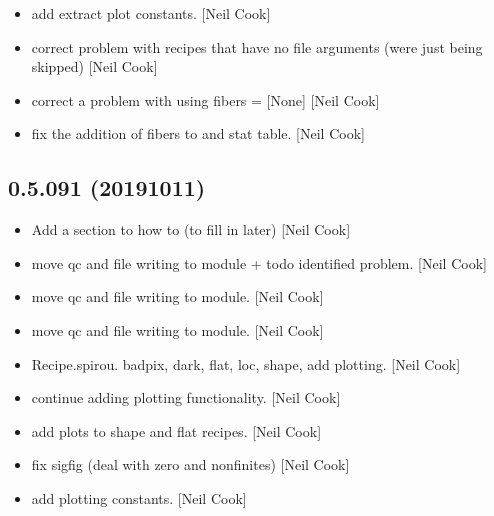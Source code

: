 \documentclass[a4paper,10pt,english]{report}
\begin{document}
\begin{itemize}
\item {} 
 \sphinxhyphen{} add extract plot constants.
{[}Neil Cook{]}

\item {} 
 \sphinxhyphen{} correct problem with recipes that have no
file arguments (were just being skipped) {[}Neil Cook{]}

\item {} 
 \sphinxhyphen{} correct a problem with using fibers = {[}None{]}
{[}Neil Cook{]}

\item {} 
 \sphinxhyphen{} fix the addition of fibers to  and stat
table. {[}Neil Cook{]}

\end{itemize}


\subsection{0.5.091 (2019\sphinxhyphen{}10\sphinxhyphen{}11)}
\label{\detokenize{misc/changelog:id70}}\begin{itemize}
\item {} 
Add a section to how to (to fill in later) {[}Neil Cook{]}

\item {} 
 \sphinxhyphen{} move qc and file writing to module + todo
identified problem. {[}Neil Cook{]}

\item {} 
 \sphinxhyphen{} move qc and file writing to module.
{[}Neil Cook{]}

\item {} 
 \sphinxhyphen{} move qc and file writing to module.
{[}Neil Cook{]}

\item {} 
Recipe.spirou. badpix, dark, flat, loc, shape,  \sphinxhyphen{} add
plotting. {[}Neil Cook{]}

\item {} 
 \sphinxhyphen{} continue adding plotting functionality. {[}Neil Cook{]}

\item {} 
 \sphinxhyphen{} add plots to shape and
flat recipes. {[}Neil Cook{]}

\item {} 
 \sphinxhyphen{} fix sigfig (deal with zero and non\sphinxhyphen{}finites)
{[}Neil Cook{]}

\item {} 
 \sphinxhyphen{} add plotting constants.
{[}Neil Cook{]}

\end{itemize}
\end{document}

